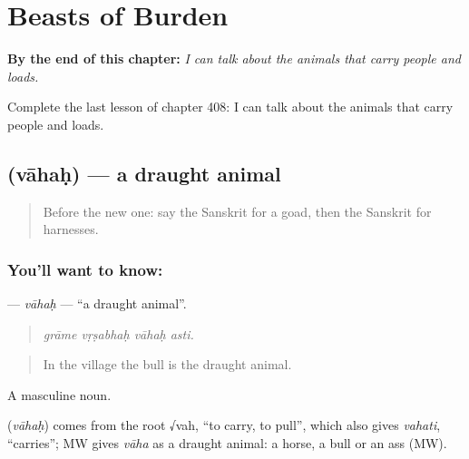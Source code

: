 
\chapter{Beasts of Burden}
\label{ch:sa-beasts-of-burden}

\begin{chapteropening}
\textbf{By the end of this chapter:} \emph{I can talk about the animals that carry people and loads.}

Complete the last lesson of chapter 408: I can talk about the animals that carry people and loads.
\end{chapteropening}

\section[\texorpdfstring{\sk{वाहः} (vāhaḥ)}{वाहः (vāhaḥ)}]{ (vāhaḥ) — a draught animal}

\label{lesson:SA-C408-vahah}



\begin{quote}
Before the new one: say the Sanskrit for a goad, then the Sanskrit for harnesses.
\end{quote}

\subsection*{You'll want to know: }
\textbf{} — \emph{vāhaḥ} — \textquotedblleft{}a draught animal\textquotedblright{}.

\begin{quote}
   
\end{quote}

\begin{quote}
\emph{grāme vṛṣabhaḥ vāhaḥ asti.}
\end{quote}

\begin{quote}
In the village the bull is the draught animal.
\end{quote}

A masculine noun.

\begin{cousinweb}
\textbf{} (\emph{vāhaḥ}) comes from the root √vah, \textquotedblleft{}to carry, to pull\textquotedblright{}, which also gives \emph{vahati}, \textquotedblleft{}carries\textquotedblright{}; MW gives \emph{vāha} as a draught animal: a horse, a bull or an ass (MW).
\end{cousinweb}

